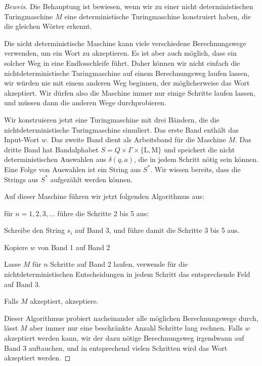 \begin{proof}[Beweis]
Die Behauptung ist bewiesen, wenn wir zu einer nicht deterministischen
Turingmaschine $M$ eine deterministische Turingmaschine konstruiert haben,
die die gleichen Wörter erkennt.

Die nicht deterministische Maschine kann viele verschiedene Berechnungswege
verwenden, um ein Wort zu akzeptieren.
Es ist aber auch möglich, dass ein solcher Weg in eine Endlosschleife führt.
Daher können wir nicht einfach die nichtdeterministische Turingmaschine
auf einem Berechnungsweg laufen lassen, wir würden nie mit einem
anderen Weg beginnen, der möglicherweise das Wort akzeptiert.
Wir dürfen also die Maschine immer nur einige Schritte laufen lassen,
und müssen dann die anderen Wege durchprobieren.

Wir konstruieren jetzt eine Turingmaschine mit drei Bändern, die die
nichtdeterministische Turingmaschine simuliert. Das erste Band
enthält das Input-Wort $w$.
Das zweite Band dient als Arbeitsband für die Maschine $M$. Das
dritte Band hat Bandalphabet $S=Q\times \Gamma\times\{\text{L},\text{M}\}$
und speichert die nicht deterministischen Auswahlen aus $\delta(q,a)$,
die  in jedem Schritt nötig sein können. Eine Folge von Auswahlen
ist ein String aus $S^*$. Wir wissen bereits, dass die Strings aus $S^*$
aufgezählt werden können.

Auf dieser Maschine führen
wir jetzt folgenden Algorithmus aus:

\begin{compactenum}
\item für $n=1,2,3,\dots$ führe die Schritte 2 bis 5 aus:
\item Schreibe den String $s_i$  auf Band 3,
und führe damit die Schritte 3 bis 5 aus.
\item Kopiere $w$ von Band 1 auf Band 2
\item Lasse $M$ für $n$ Schritte auf Band 2 laufen, verwende für die
nichtdeterministischen Entscheidungen in jedem Schritt das entsprechende
Feld auf Band 3.
\item Falls $M$ akzeptiert, akzeptiere.
\end{compactenum}
Dieser Algorithmus probiert nacheinander alle möglichen Berechnungswege
durch, lässt $M$ aber immer nur eine beschränkte Anzahl Schritte lang
rechnen. Falls $w$ akzeptiert werden kann, wir der dazu nötige Berechnungsweg
irgendwann auf Band 3 auftauchen, und in entsprechend vielen Schritten wird
das Wort akzeptiert werden.
\end{proof}

